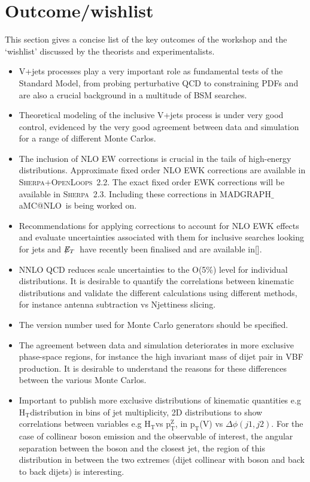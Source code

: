 \documentclass[a4paper,11pt,notoc]{article}
\makeatletter
\newcommand{\pt}{\ensuremath{\mathrm{p_T}}}
\newcommand{\ptZ}{\ensuremath{\mathrm{p_T^{Z}}}}
\newcommand{\Ht}{\ensuremath{\mathrm{H_T}}}
\newcommand{\met}{\ensuremath{\not\!\!E_T}}
\newcommand{\SHERPA}{\textsc{Sherpa}}
\newcommand{\OPENLOOPS}{\textsc{OpenLoops}}
\newcommand{\MGNLO}{MADGRAPH$\_$aMC@NLO}
\makeatother
\begin{document}
\section{Outcome/wishlist}
This section gives a concise list of the key outcomes of the workshop and the `wishlist' discussed by the theorists and experimentalists. 
\begin{itemize}
\item V+jets processes play a very important role as fundamental tests of the Standard Model, from probing perturbative QCD to constraining PDFs and are also a crucial background in a multitude of BSM searches.
\item Theoretical modeling of the inclusive V+jets process is under very good control, evidenced by the very good agreement between data and simulation for a range of different Monte Carlos.
\item The inclusion of NLO EW corrections is crucial in the tails of high-energy distributions. Approximate fixed order NLO EWK corrections are available in \SHERPA+\OPENLOOPS\ 2.2. The exact fixed order EWK corrections will be available in \SHERPA\ 2.3. Including these corrections in \MGNLO\ is being worked on.
\item Recommendations for applying corrections to account for NLO EWK effects and evaluate uncertainties associated with them for inclusive searches looking for jets and \met\ have recently been finalised and are available in[].
\item NNLO QCD reduces scale uncertainties to the O(5\%) level for individual distributions. It is desirable to quantify the correlations between kinematic distributions and validate the different calculations using different methods, for instance antenna subtraction vs Njettiness slicing.
\item The version number used for Monte Carlo generators should be specified.
\item The agreement between data and simulation deteriorates in more exclusive phase-space regions, for instance the high invariant mass of dijet pair in VBF production. It is desirable to understand the reasons for these differences between the various Monte Carlos.
\item Important to publish more exclusive distributions of kinematic quantities e.g \Ht distribution in bins of jet multiplicity, 2D distributions to show correlations between variables e.g \Ht vs \ptZ, in \pt(V) vs $\Delta\phi(j1,j2)$. For the case of collinear boson emission and the observable of interest, the angular separation between the boson and the closest jet, the region of this distribution in between the two extremes (dijet collinear with boson and back to back dijets) is interesting. 

\end{itemize}
\end{document}
